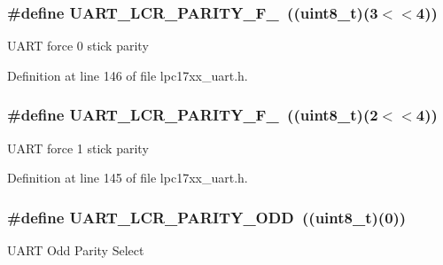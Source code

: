\subsubsection[{\texorpdfstring{U\+A\+R\+T\+\_\+\+L\+C\+R\+\_\+\+P\+A\+R\+I\+T\+Y\+\_\+\+F\+\_\+0}{UART_LCR_PARITY_F_0}}]{\setlength{\rightskip}{0pt plus 5cm}\#define U\+A\+R\+T\+\_\+\+L\+C\+R\+\_\+\+P\+A\+R\+I\+T\+Y\+\_\+\+F\+\_~(({\bf uint8\+\_\+t})(3$<$$<$4))}\hypertarget{group___u_a_r_t___private___macros_gaa5d9db8e53dae40ddaa70204fa1b60a3}{}\label{group___u_a_r_t___private___macros_gaa5d9db8e53dae40ddaa70204fa1b60a3}
U\+A\+RT force 0 stick parity 

Definition at line 146 of file lpc17xx\+\_\+uart.\+h.

\subsubsection[{\texorpdfstring{U\+A\+R\+T\+\_\+\+L\+C\+R\+\_\+\+P\+A\+R\+I\+T\+Y\+\_\+\+F\+\_\+1}{UART_LCR_PARITY_F_1}}]{\setlength{\rightskip}{0pt plus 5cm}\#define U\+A\+R\+T\+\_\+\+L\+C\+R\+\_\+\+P\+A\+R\+I\+T\+Y\+\_\+\+F\+\_~(({\bf uint8\+\_\+t})(2$<$$<$4))}\hypertarget{group___u_a_r_t___private___macros_ga17566959150e60563687a91817ddf844}{}\label{group___u_a_r_t___private___macros_ga17566959150e60563687a91817ddf844}
U\+A\+RT force 1 stick parity 

Definition at line 145 of file lpc17xx\+\_\+uart.\+h.

\subsubsection[{\texorpdfstring{U\+A\+R\+T\+\_\+\+L\+C\+R\+\_\+\+P\+A\+R\+I\+T\+Y\+\_\+\+O\+DD}{UART_LCR_PARITY_ODD}}]{\setlength{\rightskip}{0pt plus 5cm}\#define U\+A\+R\+T\+\_\+\+L\+C\+R\+\_\+\+P\+A\+R\+I\+T\+Y\+\_\+\+O\+DD~(({\bf uint8\+\_\+t})(0))}\hypertarget{group___u_a_r_t___private___macros_ga5ef9bdb85d3f5c3823d667190b19bb40}{}\label{group___u_a_r_t___private___macros_ga5ef9bdb85d3f5c3823d667190b19bb40}
U\+A\+RT Odd Parity Select 

